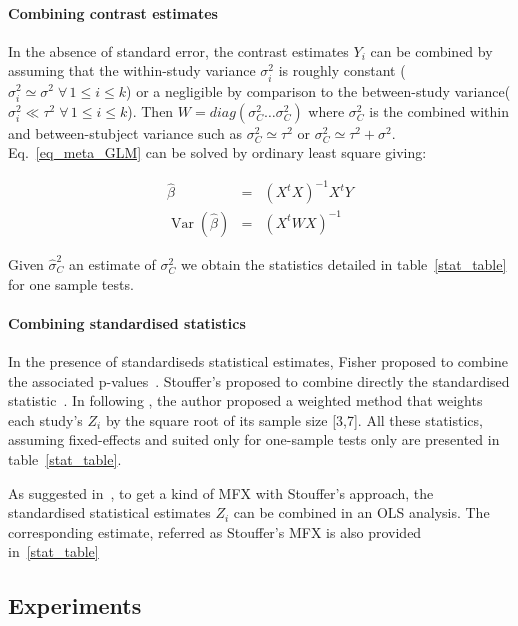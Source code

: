 \documentclass{llncs}
\DeclareMathOperator{\Var}{Var}
\newcommand{\effectvector}{Y}
\newcommand{\effect}[1][i]{\effectvector_{#1}}
\newcommand{\zeffect}[1][i]{Z_{#1}}
\newcommand{\nStudies}{k}
\newcommand{\varCombined}{\sigma^2_{C}}
\newcommand{\varBetween}{\tau^2}
\newcommand{\varWithinCommon}{\sigma^2}
\newcommand{\varWithin}[1][i]{\sigma^2_{#1}}
\begin{document}
\paragraph{Combining contrast estimates}
In the absence of standard error, the contrast estimates $\effect$ can be combined by assuming that the within-study variance $\varWithin$ is roughly constant ($\varWithin \simeq \sigma^2 \; \forall \, 1 \le i \le \nStudies $) or a negligible by comparison to the between-study variance($\varWithin \ll \varBetween \; \forall \, 1 \le i \le \nStudies $). Then $W = diag( \varCombined \ldots \varCombined )$ where $\varCombined$ is the combined within and between-stubject variance such as $\varCombined \simeq \varBetween$ or $\varCombined \simeq \varBetween + \varWithinCommon$. Eq.~\eqref{eq_meta_GLM} can be solved by ordinary least square giving:

\begin{eqnarray}
	\hat \beta  &=& (X^t X)^{-1} X^t \effectvector \\
	\Var(\hat \beta)  &=& (X^t W X)^{-1}
	\label{eq_OLS}
\end{eqnarray}

Given $\hat\varCombined$ an estimate of $\varCombined$ we obtain the statistics detailed in table~\ref{stat_table} for one sample tests.

\paragraph{Combining standardised statistics} 
In the presence of standardiseds statistical estimates, Fisher proposed to combine the associated p-values~\cite{Fisher1932}. Stouffer's proposed to combine directly the standardised statistic~\cite{Stouffer1949}. In \cite{Zaykin2011} following \cite{Liptak1958}, the author proposed a weighted method that weights each study's $\zeffect$ by the square root of its sample size [3,7]. All these statistics, assuming fixed-effects and suited only for one-sample tests only are presented in table~\ref{stat_table}.

As suggested in~\cite{Salimi-khorshidi2009}, to get a kind of MFX with Stouffer's approach, the standardised statistical estimates $\zeffect$ can be combined in an OLS analysis. The corresponding estimate, referred as Stouffer's MFX is also provided in~\ref{stat_table}

\subsection{Experiments}
\end{document}
